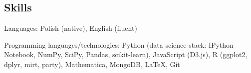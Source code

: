 \documentclass[margin,line]{resume}
\begin{document}
\begin{resume}

    \section{\mysidestyle Skills}
    \begin{list2}
        \item Languages: Polish (native), English (fluent)
        \item Programming languages/technologies: Python (data science stack: IPython Notebook, NumPy, SciPy, Pandas, scikit-learn), JavaScript (D3.js), R (ggplot2, dplyr, mirt, party), Mathematica, MongoDB, LaTeX, Git 
    \end{list2}


\end{resume}
\end{document}
